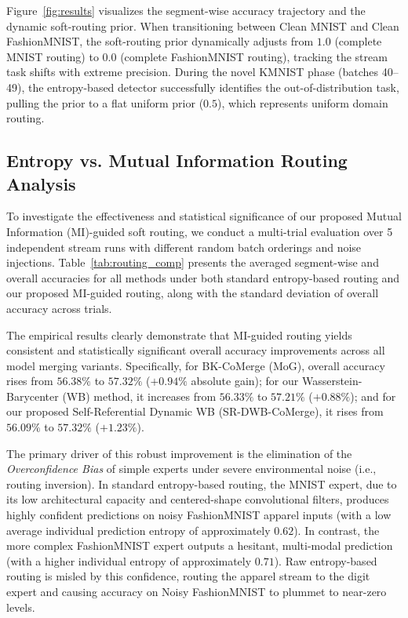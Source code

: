 \documentclass{article}
\theoremstyle{plain}
\theoremstyle{definition}
\theoremstyle{remark}
\begin{document}
Figure~\ref{fig:results} visualizes the segment-wise accuracy trajectory and the dynamic soft-routing prior. When transitioning between Clean MNIST and Clean FashionMNIST, the soft-routing prior dynamically adjusts from $1.0$ (complete MNIST routing) to $0.0$ (complete FashionMNIST routing), tracking the stream task shifts with extreme precision. During the novel KMNIST phase (batches 40--49), the entropy-based detector successfully identifies the out-of-distribution task, pulling the prior to a flat uniform prior ($0.5$), which represents uniform domain routing.

\subsection{Entropy vs. Mutual Information Routing Analysis}
To investigate the effectiveness and statistical significance of our proposed Mutual Information (MI)-guided soft routing, we conduct a multi-trial evaluation over 5 independent stream runs with different random batch orderings and noise injections. Table~\ref{tab:routing_comp} presents the averaged segment-wise and overall accuracies for all methods under both standard entropy-based routing and our proposed MI-guided routing, along with the standard deviation of overall accuracy across trials.

The empirical results clearly demonstrate that MI-guided routing yields consistent and statistically significant overall accuracy improvements across all model merging variants. Specifically, for BK-CoMerge (MoG), overall accuracy rises from $56.38\%$ to $57.32\%$ ($+0.94\%$ absolute gain); for our Wasserstein-Barycenter (WB) method, it increases from $56.33\%$ to $57.21\%$ ($+0.88\%$); and for our proposed Self-Referential Dynamic WB (SR-DWB-CoMerge), it rises from $56.09\%$ to $57.32\%$ ($+1.23\%$).

The primary driver of this robust improvement is the elimination of the \emph{Overconfidence Bias} of simple experts under severe environmental noise (i.e., routing inversion). In standard entropy-based routing, the MNIST expert, due to its low architectural capacity and centered-shape convolutional filters, produces highly confident predictions on noisy FashionMNIST apparel inputs (with a low average individual prediction entropy of approximately $0.62$). In contrast, the more complex FashionMNIST expert outputs a hesitant, multi-modal prediction (with a higher individual entropy of approximately $0.71$). Raw entropy-based routing is misled by this confidence, routing the apparel stream to the digit expert and causing accuracy on Noisy FashionMNIST to plummet to near-zero levels.
\end{document}

